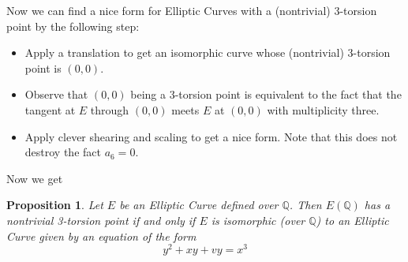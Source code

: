 \documentclass{scrartcl}
\newcommand{\Q}{\mathbb{Q}}
\newtheorem{prop}{Proposition}
\theoremstyle{definition}
\begin{document}
Now we can find a nice form for Elliptic Curves with a (nontrivial) 3-torsion point by the following step:
\begin{itemize}
    \item Apply a translation to get an isomorphic curve whose (nontrivial) 3-torsion point is $(0, 0)$.
    \item Observe that $(0, 0)$ being a 3-torsion point is equivalent to the fact that the tangent at $E$ through $(0, 0)$ meets $E$ at $(0, 0)$ with multiplicity three.
    \item Apply clever shearing and scaling to get a nice form. Note that this does not destroy the fact $a_6 = 0$.
\end{itemize}
Now we get
\begin{prop}
    Let $E$ be an Elliptic Curve defined over $\Q$.
    Then $E(\Q)$ has a nontrivial 3-torsion point if and only if $E$ is isomorphic (over $\Q$) to an Elliptic Curve given by an equation of the form
    \begin{equation*}
        y^2 + x y + v y = x^3
    \end{equation*}
\end{prop}
\end{document}
